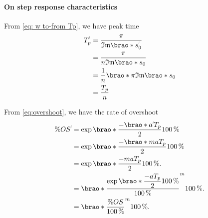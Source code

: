 \documentclass[12pt]{article}
\DeclarePairedDelimiter\brao()%
\DeclarePairedDelimiter\abs||
\newcommand{\setprime}[2][1]{%
    {#2}^{%
        \raisebox{1pt}{%
            \scalebox{0.5}{%
                \itshape\sffamily\uppercase%
                \expandafter{%
                    \romannumeral#1%
                }%
            }%
        }
    }%
}%
\begin{document}
\begin{enumerate}[(a)]
        \paragraph{On step response characteristics}
        From \eqref{eq: w to-from Tp}, we have peak time
        \begin{equation}\label{eq:peak time, m, n}
            \begin{aligned}
                      \setprime{T}_p
                &{} = \frac\pi{\mathfrak{Im}\brao*{\setprime{s}_0}}
            \\*
                &{} = \frac\pi{n\mathfrak{Im}\brao*{s_0}}
            \\*
                &{} = \frac1n\brao*{\pi{\mathfrak{Im}\brao*{s_0}}}
            \\*
                &{} = \frac{T_p}n
            \\*
            \end{aligned}
        \end{equation}

        From \eqref{eq:overshoot}, we have the rate of overshoot
        \begin{equation}\label{eq:overshoot, m, n}
            \begin{aligned}
                \%\setprime{OS} &{}= \exp\brao*{\dfrac{-\brao*{\setprime{a}}T_p}{2}} \SI{100}\percent
            \\*
                     &{}= \exp\brao*{\dfrac{-\brao*{ma}T_p}{2}} \SI{100}\percent
            \\*
                     &{}= \exp\brao*{\dfrac{-ma T_p}{2}} \SI{100}\percent.
            \\*
                     &{}= \brao*{\frac{\exp\brao*{\dfrac{-a T_p}{2}}\SI{100}\percent}{\SI{100}\percent}}^m \SI{100}\percent.
            \\*
                     &{}= \brao*{\frac{\%OS}{\SI{100}\percent}}^m \SI{100}\percent.
            \\*
            \end{aligned}
        \end{equation}


\end{enumerate}
\end{document}
